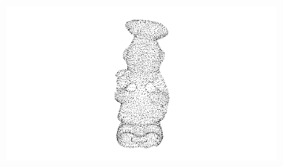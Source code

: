 \begin{figure}
\begin{subfigure}[b]{0.24\textwidth}
	\end{subfigure}
	\begin{subfigure}[b]{0.24\textwidth}
		\includegraphics[width=\textwidth]{img/ejemplos_nubes/chef_04.png}
	\end{subfigure}



\end{figure}
